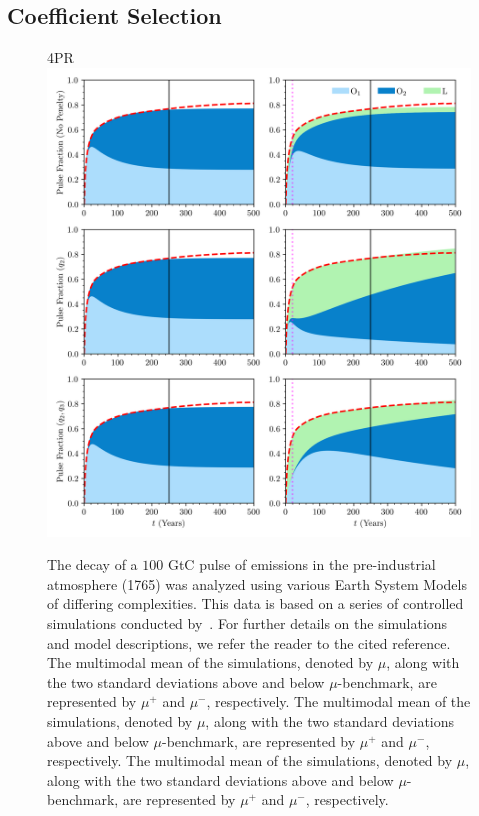 \documentclass[11pt, a4paper, pdftex, twoside, dvipsnames]{article}
\begin{document}
\subsection{Coefficient Selection}
%
 \begin{figure}[t]
    \centering
	 \raggedright{\hspace{18em}\small{\textsc{4PR}}} 
    \includegraphics[width=\textwidth]{fig/plot_flux_pen.png}
    \caption{
    The decay of a $100$ GtC pulse of emissions in the pre-industrial atmosphere (1765) was analyzed using various Earth System Models of differing complexities.
    This data is based on a series of controlled simulations conducted by~\cite{joos2013carbon}.
    For further details on the simulations and model descriptions, we refer the reader to the cited reference.
    The multimodal mean of the simulations, denoted by $\mu$, along with the two standard deviations above and below $\mu$-benchmark, are represented by $\mu^+$ and $\mu^-$, respectively.
    The multimodal mean of the simulations, denoted by $\mu$, along with the two standard deviations above and below $\mu$-benchmark, are represented by $\mu^+$ and $\mu^-$, respectively.
    The multimodal mean of the simulations, denoted by $\mu$, along with the two standard deviations above and below $\mu$-benchmark, are represented by $\mu^+$ and $\mu^-$, respectively.
     }
    \label{fig:penelty_motiv}
\end{figure}
%








 



\clearpage

\end{document}
